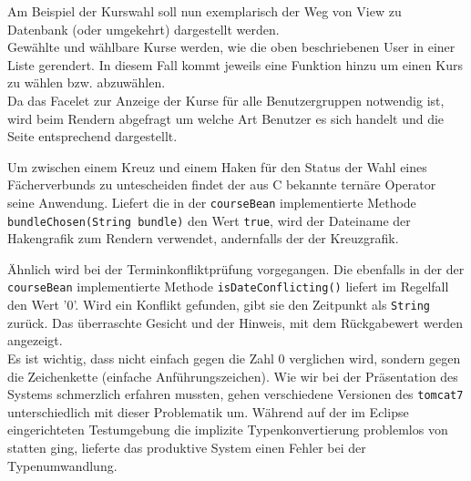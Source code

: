 Am Beispiel der Kurswahl soll nun exemplarisch der Weg von View zu Datenbank (oder umgekehrt) dargestellt werden.
\\ Gewählte und wählbare Kurse werden, wie die oben beschriebenen User in einer Liste gerendert. In diesem Fall kommt jeweils eine Funktion hinzu um einen Kurs zu wählen bzw. abzuwählen. \\Da das Facelet zur Anzeige der Kurse für alle Benutzergruppen notwendig ist, wird beim Rendern abgefragt um welche Art Benutzer es sich handelt und die Seite entsprechend dargestellt.

Um zwischen einem Kreuz und einem Haken für den Status der Wahl eines Fächerverbunds zu untescheiden findet der aus C bekannte ternäre Operator seine Anwendung. Liefert die in der \texttt{courseBean} implementierte Methode \texttt{bundleChosen(String bundle)} den Wert \texttt{true}, wird der Dateiname der Hakengrafik zum Rendern verwendet, andernfalls der der Kreuzgrafik.
	
Ähnlich wird bei der Terminkonfliktprüfung vorgegangen. Die ebenfalls in der der \texttt{courseBean} implementierte Methode \texttt{isDateConflicting()} liefert im Regelfall den Wert '0'. Wird ein Konflikt gefunden, gibt sie den Zeitpunkt als \texttt{String} zurück. Das überraschte Gesicht und der Hinweis, mit dem Rückgabewert werden angezeigt. 
\\ Es ist wichtig, dass nicht einfach gegen die Zahl 0 verglichen wird, sondern gegen die Zeichenkette (einfache Anführungszeichen). Wie wir bei der Präsentation des Systems schmerzlich erfahren mussten, gehen verschiedene Versionen des \texttt{tomcat7} unterschiedlich mit dieser Problematik um. Während auf der im Eclipse eingerichteten Testumgebung die implizite Typenkonvertierung problemlos von statten ging, lieferte das produktive System einen Fehler bei der Typenumwandlung.
		
	
